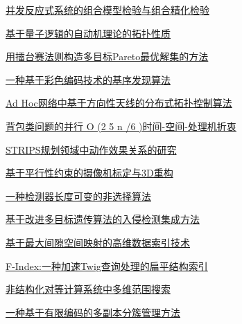 \documentclass[a4paper]{article}
\begin{document}
\href{http://www.jos.org.cn/ch/reader/download_pdf.aspx?file_no=20070602&year_id=2007&quarter_id=6&falg=1}{并发反应式系统的组合模型检验与组合精化检验}

\href{http://www.jos.org.cn/ch/reader/download_pdf.aspx?file_no=20070603&year_id=2007&quarter_id=6&falg=1}{基于量子逻辑的自动机理论的拓扑性质}

\href{http://www.jos.org.cn/ch/reader/download_pdf.aspx?file_no=20070604&year_id=2007&quarter_id=6&falg=1}{用擂台赛法则构造多目标Pareto最优解集的方法}

\href{http://www.jos.org.cn/ch/reader/download_pdf.aspx?file_no=20070605&year_id=2007&quarter_id=6&falg=1}{一种基于彩色编码技术的基序发现算法}

\href{http://www.jos.org.cn/ch/reader/download_pdf.aspx?file_no=20070606&year_id=2007&quarter_id=6&falg=1}{Ad Hoc网络中基于方向性天线的分布式拓扑控制算法}

\href{http://www.jos.org.cn/ch/reader/download_pdf.aspx?file_no=20070607&year_id=2007&quarter_id=6&falg=1}{背包类问题的并行 O (2 5 n /6 )时间-空间-处理机折衷}

\href{http://www.jos.org.cn/ch/reader/download_pdf.aspx?file_no=20070608&year_id=2007&quarter_id=6&falg=1}{STRIPS规划领域中动作效果关系的研究}

\href{http://www.jos.org.cn/ch/reader/download_pdf.aspx?file_no=20070609&year_id=2007&quarter_id=6&falg=1}{基于平行性约束的摄像机标定与3D重构}

\href{http://www.jos.org.cn/ch/reader/download_pdf.aspx?file_no=20070610&year_id=2007&quarter_id=6&falg=1}{一种检测器长度可变的非选择算法}

\href{http://www.jos.org.cn/ch/reader/download_pdf.aspx?file_no=20070611&year_id=2007&quarter_id=6&falg=1}{基于改进多目标遗传算法的入侵检测集成方法}

\href{http://www.jos.org.cn/ch/reader/download_pdf.aspx?file_no=20070614&year_id=2007&quarter_id=6&falg=1}{基于最大间隙空间映射的高维数据索引技术}

\href{http://www.jos.org.cn/ch/reader/download_pdf.aspx?file_no=20070615&year_id=2007&quarter_id=6&falg=1}{F-Index:一种加速Twig查询处理的扁平结构索引}

\href{http://www.jos.org.cn/ch/reader/download_pdf.aspx?file_no=20070616&year_id=2007&quarter_id=6&falg=1}{非结构化对等计算系统中多维范围搜索}

\href{http://www.jos.org.cn/ch/reader/download_pdf.aspx?file_no=20070617&year_id=2007&quarter_id=6&falg=1}{一种基于有限编码的多副本分簇管理方法}
\end{document}
